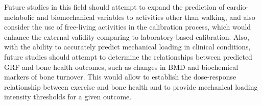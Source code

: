 \documentclass[12pt]{article}
\begin{document}
Future studies in this field should attempt to expand the prediction of cardio-metabolic and biomechanical variables to activities other than walking, and also consider the use of free-living activities in the calibration process, which would enhance the external validity comparing to laboratory-based calibration. Also, with the ability to accurately predict mechanical loading in clinical conditions, future studies should attempt to determine the relationships between predicted GRF and bone health outcomes, such as changes in BMD and biochemical markers of bone turnover. This would allow to establish the dose-response relationship between exercise and bone health and to provide mechanical loading intensity thresholds for a given outcome.
\end{document}
